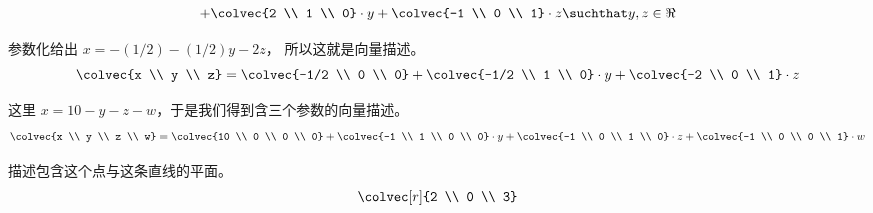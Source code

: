 \begin{exercises}
\begin{answer}
\begin{exparts}
\begin{equation*}
{                                       +\colvec{2 \\ 1 \\ 0}\cdot y
                                       +\colvec{-1 \\ 0 \\ 1}\cdot z
                             \suchthat y,z\in\Re}
          \end{equation*}
        \item 参数化给出 $x=-(1/2)-(1/2)y-2z$，
          所以这就是向量描述。
          \begin{equation*}
            \colvec{x \\ y \\ z}=\colvec{-1/2 \\ 0 \\ 0}
                                       +\colvec{-1/2 \\ 1 \\ 0}\cdot y
                                       +\colvec{-2 \\ 0 \\ 1}\cdot z
          \end{equation*}
        \item 这里 
          $x=10-y-z-w$，于是我们得到含三个参数的向量描述。
          \begin{equation*}
            \colvec{x \\ y \\ z \\ w}=\colvec{10 \\ 0 \\ 0 \\ 0}
                                       +\colvec{-1 \\ 1 \\ 0 \\ 0}\cdot y
                                       +\colvec{-1 \\ 0 \\ 1 \\ 0}\cdot z
                                       +\colvec{-1 \\ 0 \\ 0 \\ 1}\cdot w
          \end{equation*}
      \end{exparts}
    \end{answer}
  \item 
    描述包含这个点与这条直线的平面。
    \begin{equation*}
      \colvec[r]{2 \\ 0 \\ 3}

\end{equation*}
\end{exercises}

